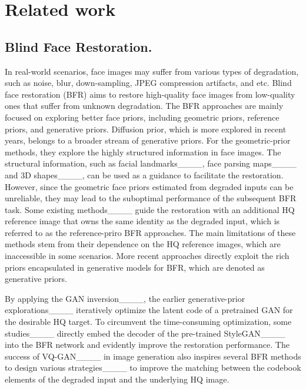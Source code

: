\section{Related work}
\subsection{Blind Face Restoration.}
In real-world scenarios, face images may suffer from various types of degradation, such as noise, blur, down-sampling, JPEG compression artifacts, and etc. Blind face restoration (BFR) aims to restore high-quality face images from low-quality ones that suffer from unknown degradation. The BFR approaches are mainly focused on exploring better face priors, including geometric priors, reference priors, and generative priors. Diffusion prior, which is more explored in recent years, belongs to a broader stream of generative priors.
For the geometric-prior methods, they explore the highly structured information in face images.
The structural information, such as facial landmarks____, face parsing maps____ and 3D shapes____, can be used as a guidance to facilitate the restoration.
However, since the geometric face priors estimated from degraded inputs can be unreliable, they may lead to the suboptimal performance of the subsequent BFR task.
Some existing methods____ guide the restoration with an additional HQ reference image that owns the same identity as the degraded input, which is referred to as the reference-priro BFR approaches. 
The main limitations of these methods stem from their dependence on the HQ reference images, which are inaccessible in some scenarios.
More recent approaches directly exploit the rich priors encapsulated in generative models for BFR, which are denoted as generative priors. 

\vspace{-1mm}
By applying the GAN inversion____, the earlier generative-prior explorations____ iteratively optimize the latent code of a pretrained GAN for the desirable HQ target.
To circumvent the time-consuming optimization, some studies____ directly embed the decoder of the pre-trained StyleGAN____ into the BFR network and evidently improve the restoration performance. 
The success of VQ-GAN____ in image generation also inspires several BFR methods to design various strategies____ to improve the matching between the codebook elements of the degraded input and the underlying HQ image.

